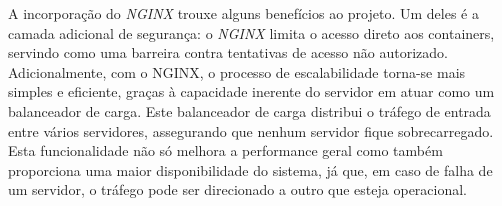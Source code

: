 A incorporação do \textit{NGINX} trouxe alguns benefícios ao projeto. Um deles é a camada adicional de segurança: o \textit{NGINX} limita o acesso direto aos containers, servindo como uma barreira contra tentativas de acesso não autorizado. Adicionalmente, com o NGINX, o processo de escalabilidade torna-se mais simples e eficiente, graças à capacidade inerente do servidor em atuar como um balanceador de carga. Este balanceador de carga distribui o tráfego de entrada entre vários servidores, assegurando que nenhum servidor fique sobrecarregado. Esta funcionalidade não só melhora a performance geral como também proporciona uma maior disponibilidade do sistema, já que, em caso de falha de um servidor, o tráfego pode ser direcionado a outro que esteja operacional.
